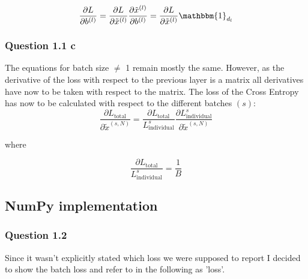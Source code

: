 \documentclass{article}
\begin{document}
\begin{equation}
	\frac{\partial L}{\partial b^{(l)}} = \frac{\partial L}{\partial \tilde{x}^{(l)}}\frac{\partial \tilde{x}^{(l)}}{\partial b^{(l)}}
	=\frac{\partial L}{\partial \tilde{x}^{(l)}} \mathbbm{1}_{d_l}
\end{equation}


\subsubsection*{Question 1.1 c}
The equations for batch size $\neq$ 1 remain mostly the same. However, as the derivative of the loss with respect to the previous layer is a matrix all derivatives have now to be taken with respect to the matrix. The loss of the Cross Entropy has now to be calculated with respect to the different batches $(s)$:
\begin{equation}
	\frac{\partial L_{\text{total}}}{\partial \tilde{x}^{(s,N)}} = \frac{\partial L_{\text{total}} }{L_{\text{individual}}^s} \frac{\partial L_{\text{individual}}^s }{\partial \tilde{x}^{(s, N)}}
\end{equation}

where

\begin{equation}
	\frac{\partial L_{\text{total}} }{L_{\text{individual}}^s} = \frac{1}{B}
\end{equation}

\subsection{NumPy implementation}
\subsubsection*{Question 1.2}

Since it wasn't explicitly stated which loss we were supposed to report I decided to show the batch loss and refer to in the following as 'loss'.
\bigskip
\end{document}

